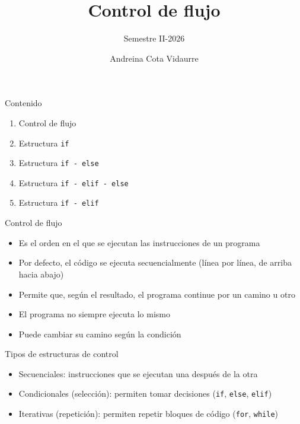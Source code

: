 \documentclass{beamer}
\title{Control de flujo} %
\subtitle{Semestre II-2026} %
\author{Andreina Cota Vidaurre}
\begin{document}
  \shorthandoff{-}
  \frame[c]{\maketitle}


    \begin{frame}[fragile,t]{Contenido}
        \begin{enumerate}
            \item Control de flujo
            \item Estructura \texttt{if}
            \item Estructura \texttt{if - else}
            \item Estructura \texttt{if - elif - else}
            \item Estructura \texttt{if - elif}
        \end{enumerate}
    \end{frame}

    \begin{frame}{Control de flujo}
        \begin{itemize}
            \item Es el orden en el que se ejecutan las instrucciones de un programa
            \item Por defecto, el código se ejecuta secuencialmente (línea por línea, de arriba hacia abajo)
            \item Permite que, según el resultado, el programa continue por un camino u otro
            \item El programa no siempre ejecuta lo mismo
            \item Puede cambiar su camino según la condición
        \end{itemize}
    \end{frame}

    \begin{frame}{Tipos de estructuras de control}
        \begin{itemize}
            \item Secuenciales: instrucciones que se ejecutan una después de la otra
            \item Condicionales (selección): permiten tomar decisiones (\texttt{if}, \texttt{else}, \texttt{elif})
            \item Iterativas (repetición): permiten repetir bloques de código (\texttt{for}, \texttt{while})
        \end{itemize}
    \end{frame}
\end{document}

